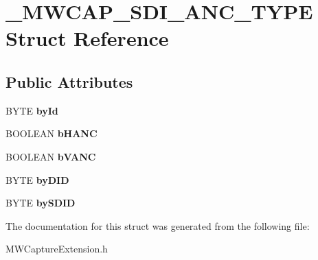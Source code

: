 \hypertarget{struct__MWCAP__SDI__ANC__TYPE}{\section{\-\_\-\-M\-W\-C\-A\-P\-\_\-\-S\-D\-I\-\_\-\-A\-N\-C\-\_\-\-T\-Y\-P\-E Struct Reference}
\label{struct__MWCAP__SDI__ANC__TYPE}
}
\subsection*{Public Attributes}
\begin{DoxyCompactItemize}
\item 
\hypertarget{struct__MWCAP__SDI__ANC__TYPE_a773d5e25985c6f084058311fa79ea624}{B\-Y\-T\-E {\bfseries by\-Id}}\label{struct__MWCAP__SDI__ANC__TYPE_a773d5e25985c6f084058311fa79ea624}

\item 
\hypertarget{struct__MWCAP__SDI__ANC__TYPE_ae0a5f29af4f50a6f304584ef62ad4714}{B\-O\-O\-L\-E\-A\-N {\bfseries b\-H\-A\-N\-C}}\label{struct__MWCAP__SDI__ANC__TYPE_ae0a5f29af4f50a6f304584ef62ad4714}

\item 
\hypertarget{struct__MWCAP__SDI__ANC__TYPE_a0f79e8c604ee1d7aba1b4f4962d0906d}{B\-O\-O\-L\-E\-A\-N {\bfseries b\-V\-A\-N\-C}}\label{struct__MWCAP__SDI__ANC__TYPE_a0f79e8c604ee1d7aba1b4f4962d0906d}

\item 
\hypertarget{struct__MWCAP__SDI__ANC__TYPE_a21d53c088a08c337ed52de5f6b121762}{B\-Y\-T\-E {\bfseries by\-D\-I\-D}}\label{struct__MWCAP__SDI__ANC__TYPE_a21d53c088a08c337ed52de5f6b121762}

\item 
\hypertarget{struct__MWCAP__SDI__ANC__TYPE_ad71a18593a97614282830d541ced2637}{B\-Y\-T\-E {\bfseries by\-S\-D\-I\-D}}\label{struct__MWCAP__SDI__ANC__TYPE_ad71a18593a97614282830d541ced2637}

\end{DoxyCompactItemize}


The documentation for this struct was generated from the following file\-:\begin{DoxyCompactItemize}
\item 
M\-W\-Capture\-Extension.\-h\end{DoxyCompactItemize}
